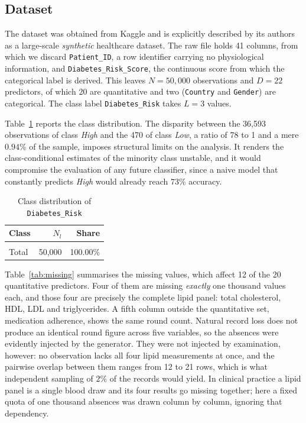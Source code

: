\documentclass[conference]{IEEEtran}
\begin{document}
\subsection{Dataset}
\label{subsec:dataset}

The dataset was obtained from Kaggle \cite{kaggle2024} and is
explicitly described by its authors as a large-scale \emph{synthetic}
healthcare dataset. The raw file holds 41 columns, from which we
discard \texttt{Patient\_ID}, a row identifier carrying no
physiological information, and \texttt{Diabetes\_Risk\_Score}, the
continuous score from which the categorical label is derived. This
leaves $N = 50{,}000$ observations and $D = 22$ predictors, of which 20
are quantitative and two (\texttt{Country} and \texttt{Gender}) are
categorical. The class label \texttt{Diabetes\_Risk} takes $L = 3$
values.

Table~\ref{tab:classdist} reports the class distribution.
The disparity between the 36{,}593 observations of class \emph{High}
and the 470 of class \emph{Low}, a ratio of 78 to 1 and a mere
$0.94\%$ of the sample, imposes structural limits on the analysis. It
renders the class-conditional estimates of the minority class
unstable, and it would compromise the evaluation of any future
classifier, since a naive model that constantly predicts \emph{High}
would already reach $73\%$ accuracy.

\begin{table}[htbp]
\caption{Class distribution of \texttt{Diabetes\_Risk}}
\label{tab:classdist}
\centering
\begin{tabular}{lrr}
\toprule
Class & $N_l$ & Share \\
\midrule
\\
\midrule
Total & 50{,}000 & 100.00\% \\
\bottomrule
\end{tabular}
\end{table}

Table~\ref{tab:missing} summarises the missing values, which affect 12
of the 20 quantitative predictors.
Four of them are missing \emph{exactly} one thousand values each, and
those four are precisely the complete lipid panel: total cholesterol,
HDL, LDL and triglycerides. A fifth column outside the quantitative
set, medication adherence, shows the same round count. Natural record
loss does not produce an identical round figure across five variables,
so the absences were evidently injected by the generator. They were
not injected by examination, however: no observation lacks all four
lipid measurements at once, and the pairwise overlap between them
ranges from 12 to 21 rows, which is what independent sampling of $2\%$
of the records would yield. In clinical practice a lipid panel is a
single blood draw and its four results go missing together; here a
fixed quota of one thousand absences was drawn column by column,
ignoring that dependency.
\end{document}
